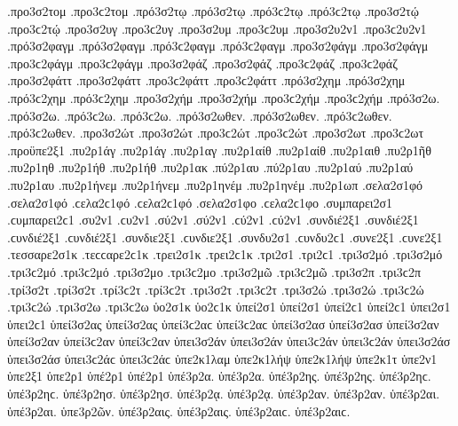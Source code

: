 {.προ3σ2τομ .προ3ϲ2τομ
.πρό3σ2τῳ .πρό3σ2τῳ .πρό3ϲ2τῳ .πρό3ϲ2τῳ   %
.προ3σ2τῴ .προ3ϲ2τῴ
.προ3σ2υγ .προ3ϲ2υγ   %
.προ3σ2υμ .προ3ϲ2υμ   %
.προ3σ2υ2ν1 .προ3ϲ2υ2ν1   %
.πρό3σ2φαγμ .πρό3σ2φαγμ .πρό3ϲ2φαγμ .πρό3ϲ2φαγμ   %
.προ3σ2φάγμ .προ3σ2φάγμ .προ3ϲ2φάγμ .προ3ϲ2φάγμ
.προ3σ2φάζ .προ3σ2φάζ .προ3ϲ2φάζ .προ3ϲ2φάζ   %
.προ3σ2φάττ .προ3σ2φάττ .προ3ϲ2φάττ .προ3ϲ2φάττ   %
.πρό3σ2χημ .πρό3σ2χημ .πρό3ϲ2χημ .πρό3ϲ2χημ   %
.προ3σ2χήμ .προ3σ2χήμ .προ3ϲ2χήμ .προ3ϲ2χήμ
.πρό3σ2ω. .πρό3σ2ω. .πρό3ϲ2ω. .πρό3ϲ2ω.
.πρό3σ2ωθεν. .πρό3σ2ωθεν. .πρό3ϲ2ωθεν. .πρό3ϲ2ωθεν.
.προ3σ2ώτ .προ3σ2ώτ .προ3ϲ2ώτ .προ3ϲ2ώτ   %
.προ3σ2ωτ .προ3ϲ2ωτ
.προϋπε2ξ1   %
.πυ2ρ1άγ .πυ2ρ1άγ   %
.πυ2ρ1αγ
.πυ2ρ1αίθ .πυ2ρ1αίθ   %
.πυ2ρ1αιθ   %
.πυ2ρ1ῆθ   %
.πυ2ρ1ηθ   %
.πυ2ρ1ήθ .πυ2ρ1ήθ   %
.πυ2ρ1ακ   %
.πύ2ρ1αυ .πύ2ρ1αυ   %
.πυ2ρ1αύ .πυ2ρ1αύ
.πυ2ρ1αυ   %
.πυ2ρ1ήνεμ .πυ2ρ1ήνεμ   %
.πυ2ρ1ηνέμ .πυ2ρ1ηνέμ
.πυ2ρ1ωπ   %
.σελα2σ1φό .σελα2σ1φό .ϲελα2ϲ1φό .ϲελα2ϲ1φό   %
.σελα2σ1φο .ϲελα2ϲ1φο
.συμπαρει2σ1 .ϲυμπαρει2ϲ1   %
.συ2ν1 .ϲυ2ν1
.σύ2ν1 .σύ2ν1 .ϲύ2ν1 .ϲύ2ν1   %
.συνδιέ2ξ1 .συνδιέ2ξ1 .ϲυνδιέ2ξ1 .ϲυνδιέ2ξ1   %
.συνδιε2ξ1 .ϲυνδιε2ξ1   %
.συνδυ2σ1 .ϲυνδυ2ϲ1   %
.συνε2ξ1 .ϲυνε2ξ1   %
.τεσσαρε2σ1κ .τεϲϲαρε2ϲ1κ   %
.τρει2σ1κ .τρει2ϲ1κ   %
.τρι2σ1 .τρι2ϲ1
.τρι3σ2μό .τρι3σ2μό .τρι3ϲ2μό .τρι3ϲ2μό   %
.τρι3σ2μο .τρι3ϲ2μο
.τρι3σ2μῶ .τρι3ϲ2μῶ
.τρι3σ2π .τρι3ϲ2π   %
.τρί3σ2τ .τρί3σ2τ .τρί3ϲ2τ .τρί3ϲ2τ   %
.τρι3σ2τ .τρι3ϲ2τ
.τρι3σ2ώ .τρι3σ2ώ .τρι3ϲ2ώ .τρι3ϲ2ώ   %
.τρι3σ2ω .τρι3ϲ2ω
ὑο2σ1κ ὑο2ϲ1κ   %
ὑπεί2σ1 ὑπεί2σ1 ὑπεί2ϲ1 ὑπεί2ϲ1
ὑπει2σ1 ὑπει2ϲ1
ὑπεί3σ2ας ὑπεί3σ2ας ὑπεί3ϲ2αϲ ὑπεί3ϲ2αϲ   %
ὑπεί3σ2ασ ὑπεί3σ2ασ
ὑπεί3σ2αν ὑπεί3σ2αν ὑπεί3ϲ2αν ὑπεί3ϲ2αν
ὑπει3σ2άν ὑπει3σ2άν ὑπει3ϲ2άν ὑπει3ϲ2άν
ὑπει3σ2άσ ὑπει3σ2άσ ὑπει3ϲ2άϲ ὑπει3ϲ2άϲ
ὑπε2κ1λαμ   %
ὑπε2κ1λήψ ὑπε2κ1λήψ   %
ὑπε2κ1τ   %
ὑπε2ν1
ὑπε2ξ1
ὑπε2ρ1
ὑπέ2ρ1 ὑπέ2ρ1
ὑπέ3ρ2α. ὑπέ3ρ2α.   %
ὑπέ3ρ2ης. ὑπέ3ρ2ης. ὑπέ3ρ2ηϲ. ὑπέ3ρ2ηϲ.
ὑπέ3ρ2ησ. ὑπέ3ρ2ησ.
ὑπέ3ρ2ᾳ. ὑπέ3ρ2ᾳ.
ὑπέ3ρ2αν. ὑπέ3ρ2αν.
ὑπέ3ρ2αι. ὑπέ3ρ2αι.
ὑπε3ρ2ῶν.
ὑπέ3ρ2αις. ὑπέ3ρ2αις. ὑπέ3ρ2αιϲ. ὑπέ3ρ2αιϲ.
}
